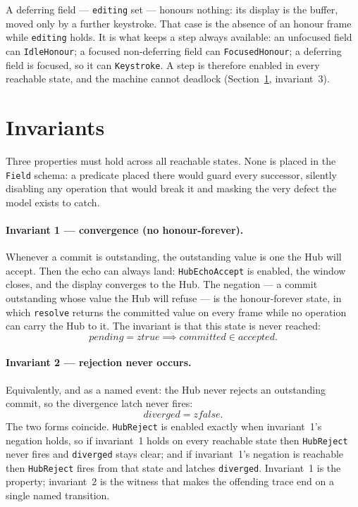 \documentclass[a4paper,10pt,fleqn]{article}
\begin{document}
A deferring field --- \texttt{editing} set --- honours nothing: its display is the
buffer, moved only by a further keystroke.  That case is the absence of an honour
frame while \texttt{editing} holds.  It is what keeps a step always available: an
unfocused field can \texttt{IdleHonour}; a focused non-deferring field can
\texttt{FocusedHonour}; a deferring field is focused, so it can \texttt{Keystroke}.
A step is therefore enabled in every reachable state, and the machine cannot
deadlock (Section~\ref{sec:inv}, invariant~3).

\section{Invariants}
\label{sec:inv}

Three properties must hold across all reachable states.  None is placed in the
\texttt{Field} schema: a predicate placed there would guard every successor,
silently disabling any operation that would break it and masking the very defect
the model exists to catch.

\paragraph{Invariant 1 --- convergence (no honour-forever).}
Whenever a commit is outstanding, the outstanding value is one the Hub will
accept.  Then the echo can always land: \texttt{HubEchoAccept} is enabled, the
window closes, and the display converges to the Hub.  The negation --- a commit
outstanding whose value the Hub will refuse --- is the honour-forever state, in
which \texttt{resolve} returns the committed value on every frame while no
operation can carry the Hub to it.  The invariant is that this state is never
reached:
\[
  pending = ztrue \implies committed \in accepted.
\]

\paragraph{Invariant 2 --- rejection never occurs.}
Equivalently, and as a named event: the Hub never rejects an outstanding commit,
so the divergence latch never fires:
\[
  diverged = zfalse.
\]
The two forms coincide.  \texttt{HubReject} is enabled exactly when invariant~1's
negation holds, so if invariant~1 holds on every reachable state then
\texttt{HubReject} never fires and \texttt{diverged} stays clear; and if
invariant~1's negation is reachable then \texttt{HubReject} fires from that state
and latches \texttt{diverged}.  Invariant~1 is the property; invariant~2 is the
witness that makes the offending trace end on a single named transition.
\end{document}
